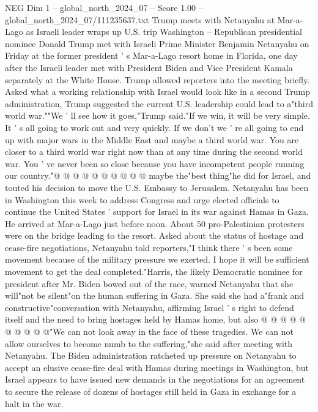\begin{textsample}{NEG Dim 1 – global\_north\_2024\_07 – Score 1.00 – global\_north\_2024\_07/111235637.txt}  \label{ex:f1_neg_068}
Trump meets with Netanyahu at Mar-a-Lago as Israeli leader wraps up U.S. trip Washington -- Republican presidential nominee Donald Trump met with Israeli Prime Minister Benjamin Netanyahu on Friday at the former president ' s Mar-a-Lago resort home in Florida, one day after the Israeli leader met with President Biden and Vice President Kamala separately at the White House.
Trump allowed reporters into the meeting briefly.
Asked what a working relationship with Israel would look like in a second Trump administration, Trump suggested the current U.S. leadership could lead to a"third world war.""We ' ll see how it goes,"Trump said."If we win, it will be very simple.
It ' s all going to work out and very quickly.
If we don't we ' re all going to end up with major wars in the Middle East and maybe a third world war.
You are closer to a third world war right now than at any time during the second world war.
You ' ve never been so close because you have incompetent people running our country."@ @ @ @ @ @ @ @ @ @ maybe the"best thing"he did for Israel, and touted his decision to move the U.S.
Embassy to Jerusalem.
Netanyahu has been in Washington this week to address Congress and urge elected officials to continue the United States ' support for Israel in its war against Hamas in Gaza.
He arrived at Mar-a-Lago just before noon.
About 50 pro-Palestinian protesters were on the bridge leading to the resort.
Asked about the status of hostage and cease-fire negotiations, Netanyahu told reporters,"I think there ' s been some movement because of the military pressure we exerted.
I hope it will be sufficient movement to get the deal completed."Harris, the likely Democratic nominee for president after Mr.
Biden bowed out of the race, warned Netanyahu that she will"not be silent"on the human suffering in Gaza.
She said she had a"frank and constructive"conversation with Netanyahu, affirming Israel ' s right to defend itself and the need to bring hostages held by Hamas home, but also @ @ @ @ @ @ @ @ @ @"We can not look away in the face of these tragedies.
We can not allow ourselves to become numb to the suffering,"she said after meeting with Netanyahu.
The Biden administration ratcheted up pressure on Netanyahu to accept an elusive cease-fire deal with Hamas during meetings in Washington, but Israel appears to have issued new demands in the negotiations for an agreement to secure the release of dozens of hostages still held in Gaza in exchange for a halt in the war.

\end{textsample}
